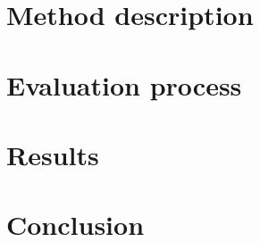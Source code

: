 \documentclass[fleqn]{IOS-Book-Article}
\begin{document}


\section{Method description} \label{sec:experiments}



\section{Evaluation process}


\section{Results} \label{sec:results}



\section{Conclusion} \label{sec:conclusion}




\newpage



%




 


\end{document}
